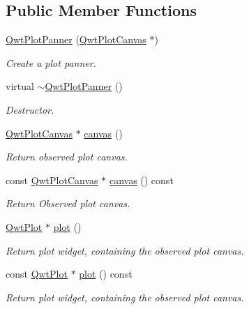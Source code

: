 \subsection*{Public Member Functions}
\begin{DoxyCompactItemize}
\item 
\hyperlink{class_qwt_plot_panner_aa9dbbfbfaf99eabdada6757211365098}{Qwt\-Plot\-Panner} (\hyperlink{class_qwt_plot_canvas}{Qwt\-Plot\-Canvas} $\ast$)
\begin{DoxyCompactList}\small\item\em Create a plot panner. \end{DoxyCompactList}\item 
virtual \hyperlink{class_qwt_plot_panner_aa72bb8323d5a8eb46900f978bf1e3623}{$\sim$\-Qwt\-Plot\-Panner} ()
\begin{DoxyCompactList}\small\item\em Destructor. \end{DoxyCompactList}\item 
\hyperlink{class_qwt_plot_canvas}{Qwt\-Plot\-Canvas} $\ast$ \hyperlink{class_qwt_plot_panner_a624eef57c43bc465d6702a0c4e8027bd}{canvas} ()
\begin{DoxyCompactList}\small\item\em Return observed plot canvas. \end{DoxyCompactList}\item 
const \hyperlink{class_qwt_plot_canvas}{Qwt\-Plot\-Canvas} $\ast$ \hyperlink{class_qwt_plot_panner_aff4e32abdfc272edc85bba43d142946f}{canvas} () const 
\begin{DoxyCompactList}\small\item\em Return Observed plot canvas. \end{DoxyCompactList}\item 
\hyperlink{class_qwt_plot}{Qwt\-Plot} $\ast$ \hyperlink{class_qwt_plot_panner_ae52375921bfacc3e17d3db45858b1485}{plot} ()
\begin{DoxyCompactList}\small\item\em Return plot widget, containing the observed plot canvas. \end{DoxyCompactList}\item 
const \hyperlink{class_qwt_plot}{Qwt\-Plot} $\ast$ \hyperlink{class_qwt_plot_panner_a2401ae1ff1e40b1ee4c7a997a895d2be}{plot} () const 
\begin{DoxyCompactList}\small\item\em Return plot widget, containing the observed plot canvas. \end{DoxyCompactList}\item 

\end{DoxyCompactItemize}
